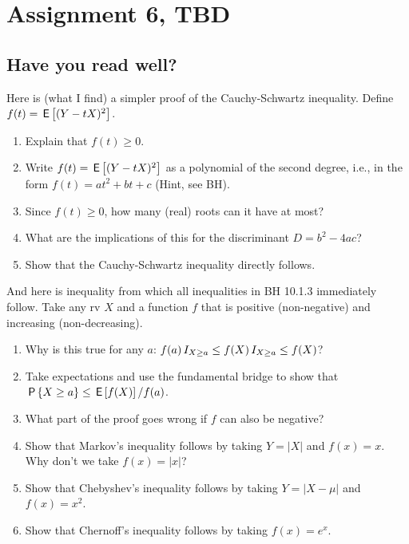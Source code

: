 \documentclass[assignments]{subfiles}
\begin{document}
\section{Assignment 6, TBD}


\subsection{Have you read well?}

\begin{exercise}
Here is (what I find) a simpler proof of the Cauchy-Schwartz inequality.  Define  $f(t) = \,\mathsf{E}\left[(Y-tX)^2\right]$.
\begin{enumerate}
\item Explain that $f(t)\geq 0$. 
\item Write $f(t) = \,\mathsf{E}\left[(Y-tX)^2\right]$ as a polynomial of the second degree, i.e., in the form $f(t) = a t^2 + b t + c$ (Hint, see BH).
\item Since $f(t) \geq 0$, how many (real) roots can it have at most? 
\item What are the implications of this for the discriminant $D=b^2-4ac$?
\item Show that the Cauchy-Schwartz inequality directly follows.
\end{enumerate}
\end{exercise}

\begin{exercise}
And here is inequality from which all inequalities in BH 10.1.3 immediately follow.
Take any rv $X$ and a function $f$ that is positive (non-negative) and  increasing (non-decreasing).
\begin{enumerate}
\item Why is this true for any $a$: $f(a) \,I_{X\geq a} \leq f(X) \,I_{X\geq a} \leq f(X)$? 
\item Take expectations and use the fundamental bridge to show that $\,\mathsf{P}\left\{X\geq a\right\} \leq \,\mathsf{E}\left[f(X)\right]/f(a)$.  
\item What part of the proof goes wrong if  $f$ can also be negative?
\item Show that Markov's inequality follows by taking $Y=|X|$ and  $f(x)=x$. Why don't we take $f(x) = |x|$?
\item Show that Chebyshev's inequality follows by taking $Y=|X-\mu|$ and $f(x)=x^2$. 
\item Show that Chernoff's inequality follows by taking $f(x)=e^{x}$. 
\end{enumerate}
\end{exercise}
\end{document}
